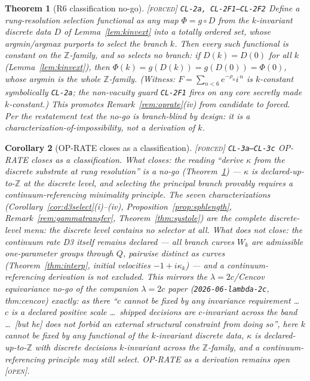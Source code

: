 \documentclass[11pt]{article}
\newcommand{\tagF}{\textcolor{cF}{\textsc{[forced]}}}
\newcommand{\tagO}{\textcolor{cO}{\textsc{[open]}}}
\newcommand{\hx}[1]{\textcolor{cC}{\footnotesize\texttt{#1}}}
\newcommand{\Z}{\mathbb{Z}}
\theoremstyle{plain}
\newtheorem{theorem}{Theorem}[section]
\newtheorem{corollary}[theorem]{Corollary}
\theoremstyle{definition}
\theoremstyle{remark}
\begin{document}
\begin{theorem}[R6 classification no-go]\label{thm:r6nogo}\tagF{} \hx{CL-2a, CL-2F1--CL-2F2}
Define a \emph{rung-resolution selection functional} as any map
$\Phi=g\circ D$ from the $k$-invariant discrete data $D$ of
Lemma~\ref{lem:kinvext} into a totally ordered set, whose argmin/argmax
purports to select the branch $k$. Then every such functional is
\emph{constant on the $\Z$-family}, and so selects no branch: if $D(k)=D(0)$
for all $k$ (Lemma~\ref{lem:kinvext}), then $\Phi(k)=g(D(k))=g(D(0))=\Phi(0)$,
whose argmin is the whole $\Z$-family. (Witness: $F=\sum_{n<6}e^{-\rho_n}i^{\,n}$
is $k$-constant symbolically \hx{CL-2a}; the non-vacuity guard \hx{CL-2F1}
fires on any core secretly made $k$-constant.) This promotes
Remark~\ref{rem:oprate}(iv) from candidate to forced. Per the restatement
test the no-go is branch-blind \emph{by design}: it is a
characterization-of-impossibility, not a derivation of $k$.
\end{theorem}

\begin{corollary}[OP-RATE closes as a classification]\label{cor:opratelass}\tagF{} \hx{CL-3a--CL-3c}
OP-RATE closes \emph{as a classification}. What closes: the reading
``derive $\kappa$ from the discrete substrate at rung resolution'' is a no-go
(Theorem~\ref{thm:r6nogo}) --- $\kappa$ is declared-up-to-$\Z$ at the discrete
level, and selecting the principal branch \emph{provably requires} a
continuum-referencing minimality principle. The seven characterizations
(Corollary~\ref{cor:d3select}(i)--(iv), Proposition~\ref{prop:sphlength},
Remark~\ref{rem:gammatransfer}, Theorem~\ref{thm:systole}) are the
\emph{complete} discrete-level menu: the discrete level contains no selector
at all. What does \emph{not} close: the continuum rate D3 itself remains
declared --- all branch curves $W_k$ are admissible one-parameter groups
through $Q$, pairwise distinct as curves (Theorem~\ref{thm:interp}, initial
velocities $-1+i\kappa_k$) --- and a continuum-referencing derivation is not
excluded. This mirrors the $\lambda=2c$/Cencov equivariance no-go of the
companion $\lambda=2c$ paper (\texttt{2026-06-lambda-2c}, thm:cencov) exactly:
as there ``$c$ cannot be fixed by any invariance requirement \ldots\ $c$ is a
declared positive scale \ldots\ shipped decisions are $c$-invariant across the
band \ldots\ [but he] does not forbid an external structural constraint from
doing so'', here $k$ cannot be fixed by any functional of the $k$-invariant
discrete data, $\kappa$ is declared-up-to-$\Z$ with discrete decisions
$k$-invariant across the $\Z$-family, and a continuum-referencing principle may
still select. OP-RATE \emph{as a derivation} remains open \tagO{}.
\end{corollary}
\end{document}
